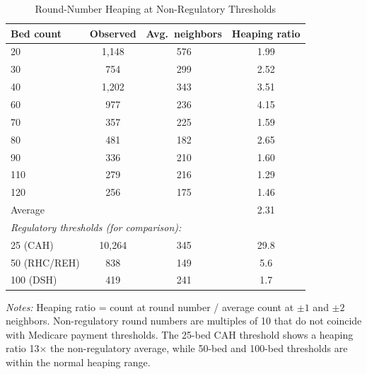 \begin{table}[htbp]
\centering
\caption{Round-Number Heaping at Non-Regulatory Thresholds}
\label{tab:heaping}
\begin{tabular}{lccc}
\hline\hline
Bed count & Observed & Avg.\ neighbors & Heaping ratio \\
\hline
20 & 1,148 & 576 & 1.99 \\
30 & 754 & 299 & 2.52 \\
40 & 1,202 & 343 & 3.51 \\
60 & 977 & 236 & 4.15 \\
70 & 357 & 225 & 1.59 \\
80 & 481 & 182 & 2.65 \\
90 & 336 & 210 & 1.60 \\
110 & 279 & 216 & 1.29 \\
120 & 256 & 175 & 1.46 \\
\hline
Average & & & 2.31 \\
\hline
\multicolumn{4}{l}{\textit{Regulatory thresholds (for comparison):}} \\
25 (CAH) & 10,264 & 345 & 29.8 \\
50 (RHC/REH) & 838 & 149 & 5.6 \\
100 (DSH) & 419 & 241 & 1.7 \\
\hline\hline
\end{tabular}
\begin{tablenotes}
\small
\item \textit{Notes:} Heaping ratio = count at round number / average count at $\pm 1$ and $\pm 2$ neighbors. Non-regulatory round numbers are multiples of 10 that do not coincide with Medicare payment thresholds. The 25-bed CAH threshold shows a heaping ratio 13$\times$ the non-regulatory average, while 50-bed and 100-bed thresholds are within the normal heaping range.
\end{tablenotes}
\end{table}

